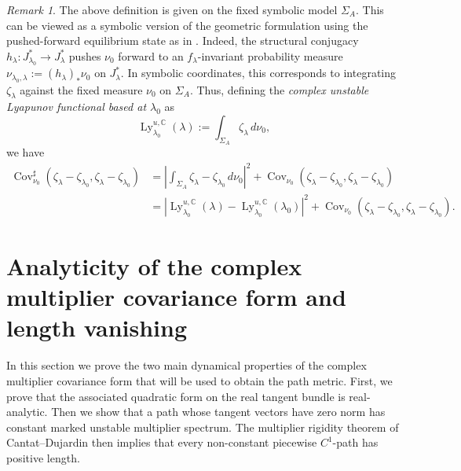\documentclass[11pt]{amsart}
\theoremstyle{plain}
\theoremstyle{definition}
\theoremstyle{remark}
\newtheorem{rmk}[thm]{Remark}
\begin{document}
\begin{rmk}
The above definition is given
on the fixed symbolic model $\Sigma_A$.
This can be viewed as a symbolic version of
the geometric formulation using the pushed-forward
equilibrium state as in \cite{HeNie23,BH24,BH25}.
Indeed, the structural conjugacy
$h_\lambda\colon J_{\lambda_0}^\ast\to J_\lambda^\ast$
pushes $\nu_0$ forward to an $f_\lambda$-invariant probability measure
$\nu_{\lambda_0,\lambda}:=(h_\lambda)_*\nu_0
$
on $J_\lambda^\ast$.
In symbolic coordinates, this corresponds to
integrating $\zeta_\lambda$ against the fixed measure $\nu_0$ on
$\Sigma_A$.
Thus,
%
defining 
the {\it complex unstable Lyapunov functional based at
$\lambda_0$} as
$$
\operatorname{Ly}^{u,\mathbb C}_{\lambda_0}(\lambda):=\int_{\Sigma_A}\zeta_\lambda\,d\nu_0,
$$ 
we have
\begin{align*}
\operatorname{Cov}^{\sharp}_{\nu_0}(\zeta_\lambda-\zeta_{\lambda_0},\zeta_\lambda-\zeta_{\lambda_0})
& = \left|\int_{\Sigma_A} \zeta_\lambda-\zeta_{\lambda_0}\,d\nu_0\right|^2
+\operatorname{Cov}_{\nu_0}(\zeta_\lambda-\zeta_{\lambda_0},\zeta_\lambda-\zeta_{\lambda_0})\\
& = \left|\operatorname{Ly}^{u,\mathbb C}_{\lambda_0}(\lambda) -
\operatorname{Ly}^{u,\mathbb C}_{\lambda_0}(\lambda_0)\right|^2
+\operatorname{Cov}_{\nu_0}(\zeta_\lambda-\zeta_{\lambda_0},\zeta_\lambda-\zeta_{\lambda_0}).
\end{align*}
\end{rmk}


\section{Analyticity of the complex multiplier covariance form and length vanishing}

In this section we prove the two main
dynamical properties of the complex multiplier covariance form that will be used to obtain the path metric. First, we prove that the associated quadratic form on the real tangent bundle is real-analytic. Then we show that a path whose tangent vectors have zero norm has constant marked unstable multiplier spectrum. The multiplier rigidity theorem of Cantat--Dujardin 
\cite{CD26Henon}
then implies that every non-constant piecewise $C^1$-path has positive length.
\end{document}
